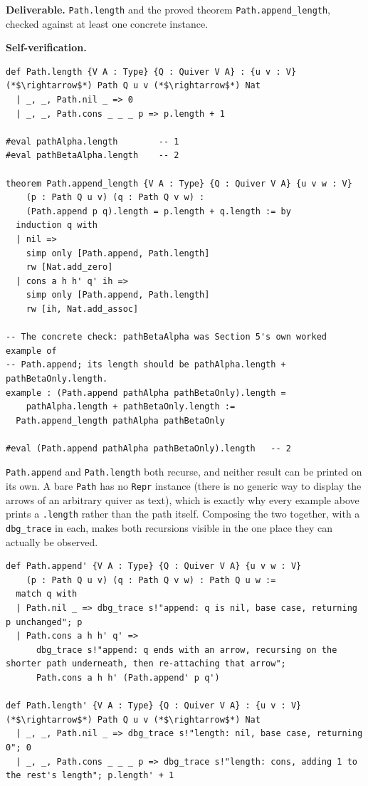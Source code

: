 \begin{pblproject}
\textbf{Deliverable.} \texttt{Path.length} and the proved theorem \texttt{Path.append\_\allowbreak{}length}, checked against at least one concrete instance.

\textbf{Self-verification.}

\begin{lstlisting}
def Path.length {V A : Type} {Q : Quiver V A} : {u v : V} (*$\rightarrow$*) Path Q u v (*$\rightarrow$*) Nat
  | _, _, Path.nil _ => 0
  | _, _, Path.cons _ _ _ p => p.length + 1

#eval pathAlpha.length        -- 1
#eval pathBetaAlpha.length    -- 2

theorem Path.append_length {V A : Type} {Q : Quiver V A} {u v w : V}
    (p : Path Q u v) (q : Path Q v w) :
    (Path.append p q).length = p.length + q.length := by
  induction q with
  | nil =>
    simp only [Path.append, Path.length]
    rw [Nat.add_zero]
  | cons a h h' q' ih =>
    simp only [Path.append, Path.length]
    rw [ih, Nat.add_assoc]

-- The concrete check: pathBetaAlpha was Section 5's own worked example of
-- Path.append; its length should be pathAlpha.length + pathBetaOnly.length.
example : (Path.append pathAlpha pathBetaOnly).length =
    pathAlpha.length + pathBetaOnly.length :=
  Path.append_length pathAlpha pathBetaOnly

#eval (Path.append pathAlpha pathBetaOnly).length   -- 2
\end{lstlisting}

\texttt{Path.append} and \texttt{Path.length} both recurse, and neither result can be printed on its own. A bare \texttt{Path} has no \texttt{Repr} instance (there is no generic way to display the arrows of an arbitrary quiver as text), which is exactly why every example above prints a \texttt{.length} rather than the path itself. Composing the two together, with a \texttt{dbg\_\allowbreak{}trace} in each, makes both recursions visible in the one place they can actually be observed.

\begin{lstlisting}
def Path.append' {V A : Type} {Q : Quiver V A} {u v w : V}
    (p : Path Q u v) (q : Path Q v w) : Path Q u w :=
  match q with
  | Path.nil _ => dbg_trace s!"append: q is nil, base case, returning p unchanged"; p
  | Path.cons a h h' q' =>
      dbg_trace s!"append: q ends with an arrow, recursing on the shorter path underneath, then re-attaching that arrow";
      Path.cons a h h' (Path.append' p q')

def Path.length' {V A : Type} {Q : Quiver V A} : {u v : V} (*$\rightarrow$*) Path Q u v (*$\rightarrow$*) Nat
  | _, _, Path.nil _ => dbg_trace s!"length: nil, base case, returning 0"; 0
  | _, _, Path.cons _ _ _ p => dbg_trace s!"length: cons, adding 1 to the rest's length"; p.length' + 1


\end{lstlisting}
\end{pblproject}
